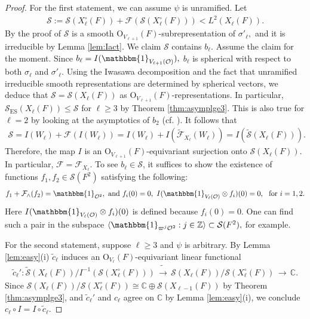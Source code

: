 \documentclass[11pt,a4paper,reqno]{amsart}
\theoremstyle{remark}
\numberwithin{equation}{section}
\newcommand{\ZZ}{\mathbb{Z}}
\newcommand{\lto}{\,\longrightarrow\,}
\newcommand{\OO}{\mathcal{O}}
\newcommand{\CC}{\mathbb{C}}
\theoremstyle{definition}
\numberwithin{equation}{section}
\newcommand{\one}{\mathbbm{1}}
\begin{document}
\begin{proof}
For the first statement, we can assume $\psi$ is unramified. Let
\begin{align*}
     \mathcal{S}:=\mathcal{S}(X_\ell^\circ(F))+\mathcal{F}\left(\mathcal{S}(X_\ell^\circ(F))\right) <L^2(X_{\ell}(F)).
 \end{align*}
By the proof of \cite[Lemma 2.13]{GK:cone} $\mathcal{S}$ is a smooth $\mathrm{O}_{V_{\ell+1}}(F)$-subrepresentation of $\sigma'_\ell,$ and it is irreducible by Lemma \ref{lem:Iact}.
We claim $\mathcal{S}$ contains $b_\ell.$  Assume the claim for the moment.
Since $b_{\ell}=I(\one_{V_{\ell+1}(\OO)}),$ $b_\ell$ is spherical with respect to both $\sigma_\ell$ and $\sigma'_\ell.$    
Using the Iwasawa decomposition and the fact that 
unramified irreducible smooth representations are determined by spherical vectors, we deduce that $\mathcal{S}=\mathcal{S}(X_\ell(F))$ as $\mathrm{O}_{V_{\ell+1}}(F)$-representations. In particular, $\mathcal{S}_{\mathrm{ES}}(X_\ell(F))\le \mathcal{S}$ for $\ell\ge 3$ by Theorem \ref{thm:asymplge3}. This is also true for $\ell=2$ by looking at the asymptotics of $b_2$ (cf. \cite[Corollary 6.7]{Hsu:asymptotics}). It follows that 
\begin{align*}
\mathcal{S}=I(W_\ell)+\mathcal{F}(I(W_\ell))=I(W_\ell)+I(\widetilde{\mathcal{F}}_{X_{\ell}}(W_\ell))=I(\widetilde{\mathcal{S}}(X_{\ell}(F))).
\end{align*}
Therefore, the map $I$ is an $\mathrm{O}_{V_{\ell+1}}(F)$-equivariant surjection onto $\mathcal{S}(X_\ell(F))$. In particular, $\mathcal{F}=\mathcal{F}_{X_\ell}$. To see $b_\ell\in \mathcal{S}$, it suffices to show the existence of  functions $f_1,f_2\in \mathcal{S}(F^2)$ satisfying the following:
 \begin{align*}
     f_1+\mathcal{F}_\wedge(f_2)=\one_{\OO^2}, \textrm{ and }  f_i(0)=0, \,\,I(\one_{V_\ell(\OO)}\otimes f_i)(0)=0, \,\,\textrm{ for } i=1,2.
 \end{align*}
 Here $I(\one_{V_{\ell}(\OO)} \otimes f_i)(0)$ is defined because $f_i(0)=0.$
 One can find such a pair in the subspace $\langle \one_{\varpi^j\OO^2}: j \in \ZZ  \rangle\subset\mathcal{S}(F^2),$ for example. 
 
For the second statement, suppose $\ell\ge 3$ and $\psi$ is arbitrary. By Lemma \ref{lem:easy}(i) $\tilde{c}_\ell$ induces an $\mathrm{O}_{V_\ell}(F)$-equivariant linear functional 
\begin{align*}
    \tilde{c}_\ell':\widetilde{\mathcal{S}}(X_\ell(F))/I^{-1}(\mathcal{S}(X_\ell^\circ(F)))\tilde{\lto}\mathcal{S}(X_\ell(F))/\mathcal{S}(X_\ell^\circ(F))\lto \CC.
\end{align*}
Since $\mathcal{S}(X_\ell(F))/\mathcal{S}(X_\ell^\circ(F))\cong \CC\oplus \mathcal{S}(X_{\ell-1}(F))$ by Theorem \ref{thm:asymplge3}, and $\tilde{c}_\ell'$ and $c_\ell$ agree on $\CC$ by Lemma \ref{lem:easy}(i), we conclude $c_\ell\circ I=I\circ \tilde{c}_\ell$. 


\end{proof}
\end{document}
